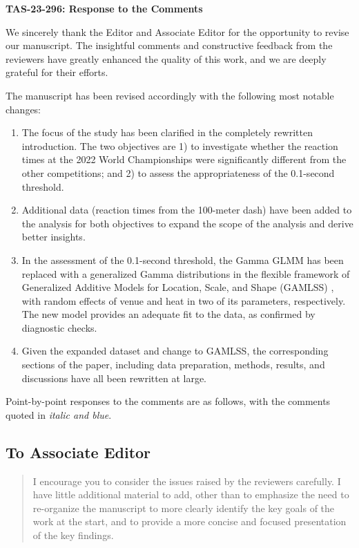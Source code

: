 \documentclass[12pt]{article}
\newenvironment{comment}%
{\begin{quotation}\noindent\small\it\color{darkblue}\ignorespaces%
}{\end{quotation}}
\begin{document}
\begin{center}
  {\Large\bf TAS-23-296: Response to the Comments}
\end{center}

We sincerely thank the Editor and Associate Editor for the opportunity
to revise our manuscript. The insightful comments and constructive
feedback from the reviewers have greatly enhanced the quality of this
work, and we are deeply grateful for their efforts.


The manuscript has been revised accordingly with the following most
notable changes:
\begin{enumerate}
\item
  The focus of the study has been clarified in the completely
  rewritten introduction. The two objectives are 1) to investigate
  whether the reaction times at the 2022 World Championships were
  significantly different from the other competitions; and 2) to
  assess the appropriateness of the 0.1-second threshold.
\item
  Additional data (reaction times from the 100-meter dash) have been
  added to the analysis for both objectives to expand the scope of the
  analysis and derive better insights.
\item
  In the assessment of the 0.1-second threshold, the Gamma GLMM has
  been replaced with a generalized Gamma distributions in the flexible
  framework of Generalized Additive Models for Location, Scale, and
  Shape (GAMLSS) \citep{stasinopoulos2024generalized}, with random
  effects of venue and heat in two of its parameters, respectively.
  The new model provides an adequate fit to the data, as confirmed by
  diagnostic checks.
\item
  Given the expanded dataset and change to GAMLSS, the corresponding
  sections of the paper, including data preparation, methods, results,
  and discussions have all been rewritten at large.
\end{enumerate}

Point-by-point responses to the comments are as follows, with the
comments quoted in \emph{\color{darkblue} italic and blue}.


\subsection*{To Associate Editor}

\begin{comment}
I encourage you to consider the issues raised by the reviewers carefully. I have
little additional material to add, other than to emphasize the need to
re-organize the manuscript to more clearly identify the key goals of the work at
the start, and to provide a more concise and focused presentation of the key
findings.
\end{comment}
\end{document}
